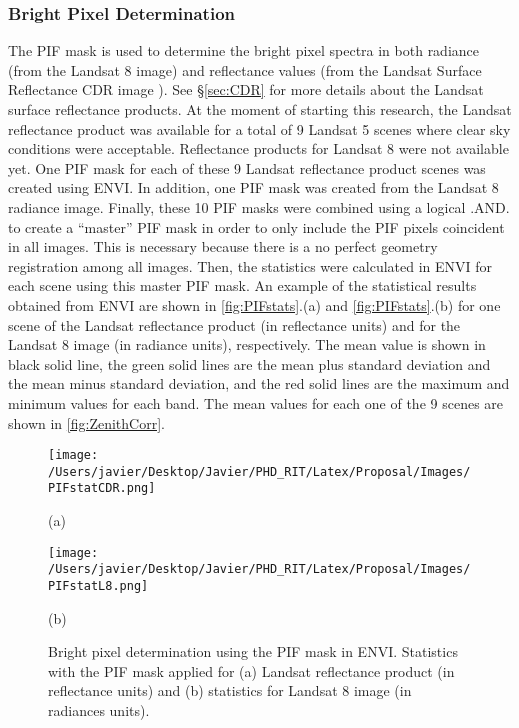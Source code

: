 \subsubsection{Bright Pixel Determination}
The PIF mask is used to determine the bright pixel spectra in both radiance (from the Landsat 8 image) and reflectance values (from the Landsat Surface Reflectance CDR image \cite{LandsatCDR,L8SurfProduct2015}). See \S\ref{sec:CDR} for more details about the Landsat surface reflectance products. At the moment of starting this research, the Landsat reflectance product was available for a total of 9 Landsat 5 scenes where clear sky conditions were acceptable. Reflectance products for Landsat 8 were not available yet. One PIF mask for each of these 9 Landsat reflectance product scenes was created using ENVI. In addition, one PIF mask was created from the Landsat 8 radiance image. Finally, these 10 PIF masks were combined using a logical .AND. to create a ``master'' PIF mask  in order to only include the PIF pixels coincident in all images. This is necessary because there is a no perfect geometry registration among all images. Then, the statistics were calculated in ENVI for each scene using this master PIF mask. An example of the statistical results obtained from ENVI are shown in \autoref{fig:PIFstats}.(a) and \autoref{fig:PIFstats}.(b) for one scene of the Landsat reflectance product (in reflectance units) and for the Landsat 8 image (in radiance units), respectively. The mean value is shown in black solid line, the green solid lines are the mean plus standard deviation and the mean minus standard deviation, and the red solid lines are the maximum and minimum values for each band. The mean values for each one of the 9 scenes are shown in \autoref{fig:ZenithCorr}. 

\begin{figure}[!ht]
  \begin{minipage}[c]{0.48\linewidth}
    \centering
      \texttt{[image: /Users/javier/Desktop/Javier/PHD\_RIT/Latex/Proposal/Images/PIFstatCDR.png]}  
    \centerline{(a)}\medskip
  \end{minipage}
  \hfill
  \begin{minipage}[d]{0.48\linewidth}
    \centering
      \texttt{[image: /Users/javier/Desktop/Javier/PHD\_RIT/Latex/Proposal/Images/PIFstatL8.png]}
    \centerline{(b)}\medskip
  \end{minipage}
  \caption{Bright pixel determination using the PIF mask in ENVI. Statistics with the PIF mask applied for (a) Landsat reflectance product (in reflectance units) and (b) statistics for Landsat 8 image (in radiances units). \label{fig:PIFstats} } 
\end{figure}

